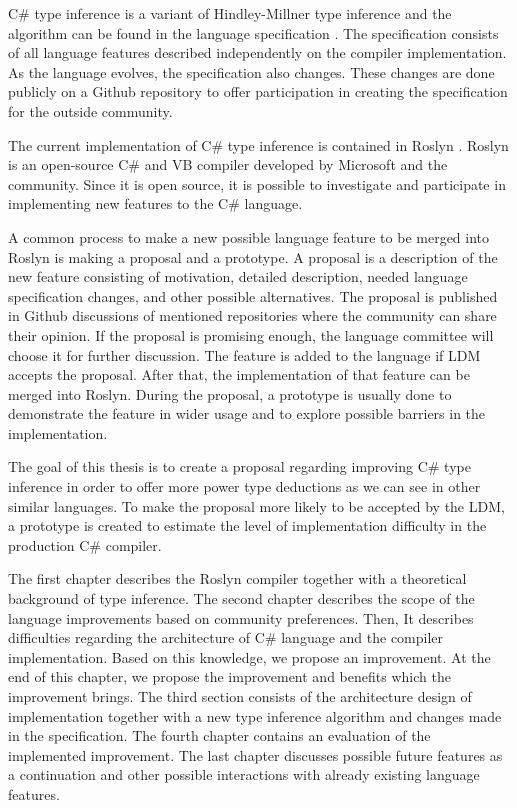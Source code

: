 \par
{}
C\# type inference is a variant of Hindley-Millner type inference and the algorithm can be found in the language specification \cite{online:langSpec}.
The specification consists of all language features described independently on the compiler implementation.
As the language evolves, the specification also changes.
These changes are done publicly on a Github repository \cite{online:langRepo} to offer participation in creating the specification for the outside community.
\par
{}
The current implementation of C\# type inference is contained in Roslyn \cite{online:roslynRepo}.
Roslyn is an open-source C\# and VB compiler developed by Microsoft and the community.
Since it is open source, it is possible to investigate and participate in implementing new features to the C\# language.
\par
{}
A common process to make a new possible language feature to be merged into Roslyn is making a proposal and a prototype.
A proposal is a description of the new feature consisting of motivation, detailed description, needed language specification changes, and other possible alternatives.
The proposal is published in Github discussions of mentioned repositories where the community can share their opinion.
If the proposal is promising enough, the language committee will choose it for further discussion.
The feature is added to the language if \ac{LDM} accepts the proposal.
After that, the implementation of that feature can be merged into Roslyn.
During the proposal, a prototype is usually done to demonstrate the feature in wider usage and to explore possible barriers in the implementation.
\par
{}
The goal of this thesis is to create a proposal regarding improving C\# type inference in order to offer more power type deductions as we can see in other similar languages.
To make the proposal more likely to be accepted by the \ac{LDM}, a prototype is created to estimate the level of implementation difficulty in the production C\# compiler.
\par
{}
The first chapter describes the Roslyn compiler together with a theoretical background of type inference.
The second chapter describes the scope of the language improvements based on community preferences.
Then, It describes difficulties regarding the architecture of C\# language and the compiler implementation.
Based on this knowledge, we propose an improvement.
At the end of this chapter, we propose the improvement and benefits which the improvement brings.
The third section consists of the architecture design of implementation together with a new type inference algorithm and changes made in the specification.
The fourth chapter contains an evaluation of the implemented improvement.
The last chapter discusses possible future features as a continuation and other possible interactions with already existing language features.